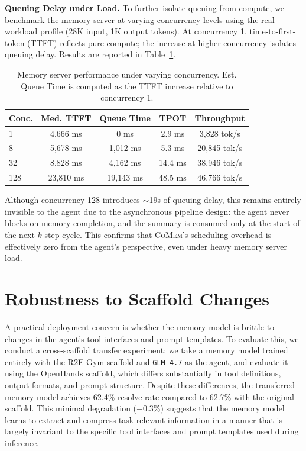\documentclass{article}
\theoremstyle{plain}
\theoremstyle{definition}
\theoremstyle{remark}
\newcommand{\model}{\textsc{CoMem}\xspace}
\begin{document}
\noindent \textbf{Queuing Delay under Load.}
To further isolate queuing from compute, we benchmark the memory server at varying concurrency levels using the real workload profile (28K input, 1K output tokens). At concurrency 1, time-to-first-token (TTFT) reflects pure compute; the increase at higher concurrency isolates queuing delay. Results are reported in Table~\ref{tab:scheduling}.

\begin{table}[h]
\centering
\setlength{\tabcolsep}{4pt}
\renewcommand{\arraystretch}{1.3}
\caption{Memory server performance under varying concurrency. Est. Queue Time is computed as the TTFT increase relative to concurrency 1.}
\label{tab:scheduling}
\begin{tabular}{l c c c c}
\toprule
Conc. & Med. TTFT & Queue Time & TPOT & Throughput \\
\midrule
1 & 4,666 ms & 0 ms & 2.9 ms & 3,828 tok/s \\
8 & 5,678 ms & 1,012 ms & 5.3 ms & 20,845 tok/s \\
32 & 8,828 ms & 4,162 ms & 14.4 ms & 38,946 tok/s \\
128 & 23,810 ms & 19,143 ms & 48.5 ms & 46,766 tok/s \\
\bottomrule
\end{tabular}
\end{table}

Although concurrency 128 introduces $\sim$19s of queuing delay, this remains entirely invisible to the agent due to the asynchronous pipeline design: the agent never blocks on memory completion, and the summary is consumed only at the start of the next $k$-step cycle. This confirms that {\model}'s scheduling overhead is effectively zero from the agent's perspective, even under heavy memory server load.

\section{Robustness to Scaffold Changes}
\label{app:scaffold}

A practical deployment concern is whether the memory model is brittle to changes in the agent's tool interfaces and prompt templates. To evaluate this, we conduct a cross-scaffold transfer experiment: we take a memory model trained entirely with the R2E-Gym scaffold and \texttt{GLM-4.7} as the agent, and evaluate it using the OpenHands scaffold, which differs substantially in tool definitions, output formats, and prompt structure. Despite these differences, the transferred memory model achieves 62.4\% resolve rate compared to 62.7\% with the original scaffold. This minimal degradation ($-$0.3\%) suggests that the memory model learns to extract and compress task-relevant information in a manner that is largely invariant to the specific tool interfaces and prompt templates used during inference.
\end{document}
